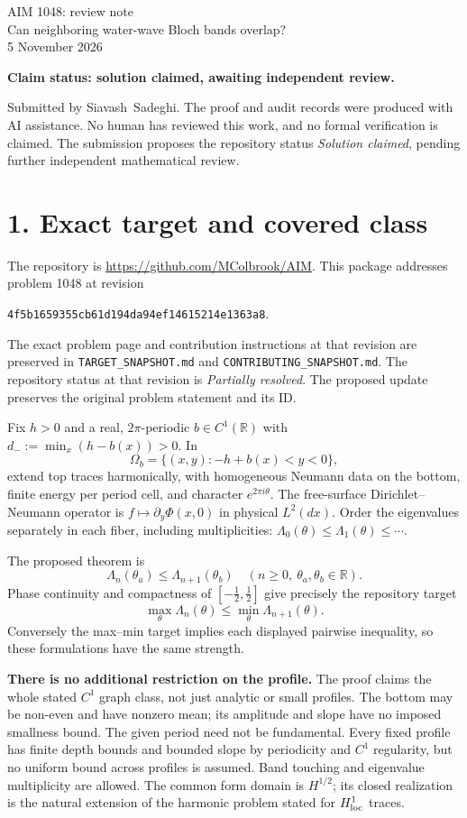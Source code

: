 \documentclass[11pt]{article}
\begin{document}
\begin{center}
{\LARGE AIM 1048: review note}\\[5pt]
{\large Can neighboring water-wave Bloch bands overlap?}\\[5pt]
5 November 2026
\end{center}

\textbf{Claim status: solution claimed, awaiting independent review.}

Submitted by Siavash~Sadeghi. The proof and audit records were produced
with AI assistance. No human has reviewed this work, and no formal
verification is claimed. The submission proposes the repository status
\emph{Solution claimed}, pending further independent mathematical review.

\section*{1. Exact target and covered class}
The repository is \url{https://github.com/MColbrook/AIM}. This package
addresses problem 1048 at revision
\begin{center}
\texttt{4f5b1659355cb61d194da94ef14615214e1363a8}.
\end{center}
The exact problem page and contribution instructions at that revision
are preserved in \texttt{TARGET\_SNAPSHOT.md} and
\texttt{CONTRIBUTING\_SNAPSHOT.md}. The repository status at that revision
is \emph{Partially resolved}. The proposed update preserves the original
problem statement and its ID.

Fix $h>0$ and a real, $2\pi$-periodic $b\in C^1(\mathbb R)$ with
$d_-:=\min_x(h-b(x))>0$. In
\[
\Omega_b=\{(x,y):-h+b(x)<y<0\},
\]
extend top traces harmonically, with homogeneous Neumann data on the
bottom, finite energy per period cell, and character $e^{2\pi i\theta}$.
The free-surface Dirichlet--Neumann operator is $f\mapsto\partial_y\Phi(x,0)$
in physical $L^2(dx)$. Order the eigenvalues separately in each fiber,
including multiplicities:
$\Lambda_0(\theta)\le\Lambda_1(\theta)\le\cdots$.

The proposed theorem is
\[
\boxed{\Lambda_n(\theta_a)\le\Lambda_{n+1}(\theta_b)
\quad(n\ge0,\ \theta_a,\theta_b\in\mathbb R).}
\]
Phase continuity and compactness of $[-\tfrac12,\tfrac12]$ give precisely
the repository target
\[
\max_\theta\Lambda_n(\theta)\le\min_\theta\Lambda_{n+1}(\theta).
\]
Conversely the max--min target implies each displayed pairwise inequality,
so these formulations have the same strength.

\textbf{There is no additional restriction on the profile.} The proof
claims the whole stated $C^1$ graph class, not just analytic or small
profiles. The bottom may be non-even and have nonzero mean; its amplitude
and slope have no imposed smallness bound. The given period need not be
fundamental. Every fixed profile has finite depth bounds and bounded slope
by periodicity and $C^1$ regularity, but no uniform bound across profiles
is assumed. Band touching and eigenvalue multiplicity are allowed.
The common form domain is $H^{1/2}$; its closed realization is the natural
extension of the harmonic problem stated for $H^1_{\rm loc}$ traces.
\end{document}
